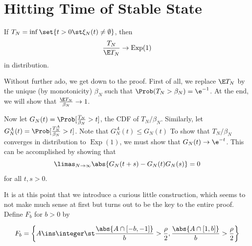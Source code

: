 \documentclass{scrartcl}
\DeclareMathOperator{\expDist}{Exp}
\begin{document}
\section{Hitting Time of Stable State}

\begin{theorem}
  If $T_{N} = \inf\set{t > 0 \st \xi_{N}(t) \neq \emptyset}$, then
  \[ \frac{T_{N}}{\E T_{N}} \to \expDist(1) \]
  in distribution.
\end{theorem}

Without further ado, we get down to the proof. First of all, we replace $\E T_{N}$ by the unique (by monotonicity) $\beta_{N}$ such that $\Prob(T_{N} > \beta_{N}) = \e^{-1}$. At the end, we will show that $\frac{\E T_{N}}{\beta_{N}} \to 1$.

Now let $G_{N}(t) = \Prob[\frac{T_{N}}{\beta_{N}} > t]$, the CDF of $T_{N}/\beta_{N}$. Similarly, let $G_{N}^{A}(t) = \Prob[\frac{T^{A}_{N}}{\beta_{N}} > t]$. Note that $G_{N}^{A}(t) \leq G_{N}(t)$ To show that $T_{N}/\beta_{N}$ converges in distribution to $\expDist(1)$, we must show that $G_{N}(t) \to \e^{-t}$. This can be accomplished by showing that
\[ \limas_{N \to \infty} \abs{G_{N}(t+s) - G_{N}(t)G_{N}(s)} = 0 \]
for all $t,s > 0$.

%
%

It is at this point that we introduce a curious little construction, which seems to not make much sense at first but turns out to be the key to the entire proof. Define $F_{b}$ for $b > 0$ by

\[ F_{b} = \left\{A \ins \integer \st \frac{\abs{A \cap [-b,-1]}}{b} > \frac{\rho}{2}, \frac{\abs{A \cap [1,b]}}{b} > \frac{\rho}{2}\right\} \]
\end{document}
